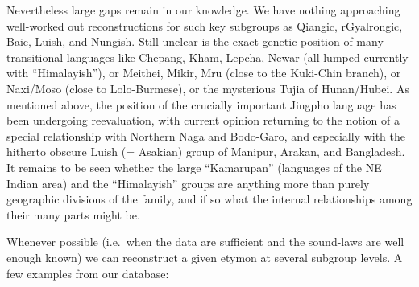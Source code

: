 Nevertheless large gaps remain in our knowledge. We have nothing approaching  well-worked out reconstructions for such key subgroups as Qiangic, rGyalrongic, Baic, Luish, and Nungish. Still unclear is the exact genetic position of many transitional languages like Chepang, Kham, Lepcha, Newar (all lumped currently with “Himalayish”), or Meithei, Mikir, Mru (close to the Kuki-Chin branch), or Naxi/Moso (close to Lolo-Burmese), or the mysterious Tujia of Hunan/Hubei. As mentioned above, the position of the crucially important Jingpho language has been undergoing reevaluation, with current opinion returning to the notion of a special relationship with Northern Naga and Bodo-Garo, and especially with the hitherto obscure Luish (= Asakian) group of Manipur, Arakan, and Bangladesh. It remains to be seen whether the large “Kamarupan” (languages of the NE Indian area) and the “Himalayish” groups are anything more than purely geographic divisions of the family, and if so what the internal relationships among their many parts might be.

Whenever possible (i.e.\ when the data are sufficient and the sound-laws are well enough known) we can reconstruct a given etymon at several subgroup levels. A few examples from our database: 


